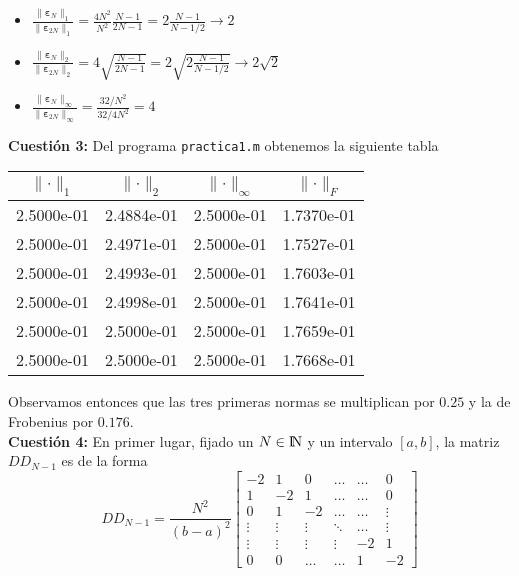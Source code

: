 \documentclass[12pt]{article}
\newcommand{\NN}{{\rm I\!N}}
\newcommand{\norm}[1]{\lVert #1\rVert}
\theoremstyle{definition}
\begin{document}
\begin{itemize}
	\item $\displaystyle \frac{\norm{\bm{\varepsilon}_N}_1}{\norm{\bm{\varepsilon}_{2N}}_1} = \frac{4N^2}{N^2}\frac{N-1}{2N-1} = 2\frac{N-1}{N - 1/2} \longrightarrow 2$
	\item $\displaystyle \frac{\norm{\bm{\varepsilon}_N}_2}{\norm{\bm{\varepsilon}_{2N}}_2} = 4\sqrt{\frac{N-1}{2N-1}} = 2\sqrt{2 \frac{N-1}{N - 1/2}} \longrightarrow 2\sqrt{2}$
	\item $\displaystyle \frac{\norm{\bm{\varepsilon}_N}_\infty}{\norm{\bm{\varepsilon}_{2N}}_\infty} = \frac{32 / N^2}{32 / 4N^2} = 4$
\end{itemize}
\noindent\textbf{Cuestión 3:}
Del programa \texttt{practica1.m} obtenemos la siguiente tabla
{ \begin{center}
		\begin{tabular}{ | c | c | c | c |}
			\hline
			$\norm{\cdot}_1$ & $\norm{\cdot}_2$ & $\norm{\cdot}_\infty$ & $\norm{\cdot}_F$ \\
			\hline\hline
			2.5000e-01 & 2.4884e-01 & 2.5000e-01 & 1.7370e-01 \\
			2.5000e-01 & 2.4971e-01 & 2.5000e-01 & 1.7527e-01 \\
			2.5000e-01 & 2.4993e-01 & 2.5000e-01 & 1.7603e-01 \\
			2.5000e-01 & 2.4998e-01 & 2.5000e-01 & 1.7641e-01 \\
			2.5000e-01 & 2.5000e-01 & 2.5000e-01 & 1.7659e-01 \\
			2.5000e-01 & 2.5000e-01 & 2.5000e-01 & 1.7668e-01 \\
			\hline
		\end{tabular}
\end{center}}
Observamos entonces que las tres primeras normas se multiplican por $0.25$ y la de Frobenius por $0.176$. \\
\newline 
\noindent\textbf{Cuestión 4:} En primer lugar, fijado un $N\in\NN$ y un intervalo $[a,b]$, la matriz $DD_{N-1}$ es de la forma
$$DD_{N-1} = \frac{N^2}{(b-a)^2}\begin{bmatrix}
	-2 & 1 & 0 & \dots & \dots & 0 \\
	1 & -2  & 1 & \dots  & \dots  & 0 \\
	0 & 1 & -2 & \dots & \dots & \vdots \\
	\vdots  & \vdots & \vdots & \ddots & \dots & \vdots \\
	\vdots & \vdots & \vdots & \vdots & -2 & 1 \\
	0 & 0 & \dots & \dots & 1 & -2 
\end{bmatrix}$$
\end{document}
